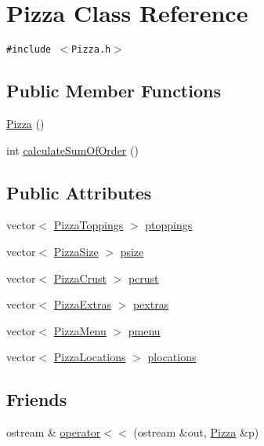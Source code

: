 \hypertarget{class_pizza}{
\section{Pizza Class Reference}
\label{class_pizza}
}
{\tt \#include $<$Pizza.h$>$}

\subsection*{Public Member Functions}
\begin{CompactItemize}
\item 
\hyperlink{class_pizza_700ffe7c4bc34e2c456faa65be04ce6b}{Pizza} ()
\item 
int \hyperlink{class_pizza_24b9bb5302a251b41fed3df1fb7ce8ad}{calculate\-Sum\-Of\-Order} ()
\end{CompactItemize}
\subsection*{Public Attributes}
\begin{CompactItemize}
\item 
vector$<$ \hyperlink{class_pizza_toppings}{Pizza\-Toppings} $>$ \hyperlink{class_pizza_00a8ee0e60c8a0813bd0253e2ce99090}{ptoppings}
\item 
vector$<$ \hyperlink{class_pizza_size}{Pizza\-Size} $>$ \hyperlink{class_pizza_e0615fa3029d85be3e626ed0d6e2f6ae}{psize}
\item 
vector$<$ \hyperlink{class_pizza_crust}{Pizza\-Crust} $>$ \hyperlink{class_pizza_996e08e9df9ac8ddc88bd05cd6e02761}{pcrust}
\item 
vector$<$ \hyperlink{class_pizza_extras}{Pizza\-Extras} $>$ \hyperlink{class_pizza_daa120a92c418c69c30c510e3d6fceb4}{pextras}
\item 
vector$<$ \hyperlink{class_pizza_menu}{Pizza\-Menu} $>$ \hyperlink{class_pizza_b86f8b99db37aed0b14a52090e90df73}{pmenu}
\item 
vector$<$ \hyperlink{class_pizza_locations}{Pizza\-Locations} $>$ \hyperlink{class_pizza_4089a0661af312f0d870f8ac9a4bd03c}{plocations}
\end{CompactItemize}
\subsection*{Friends}
\begin{CompactItemize}
\item 
ostream \& \hyperlink{class_pizza_6234ace0cc7b9a861bdeecd0223d6b69}{operator$<$$<$} (ostream \&out, \hyperlink{class_pizza}{Pizza} \&p)
\end{CompactItemize}


